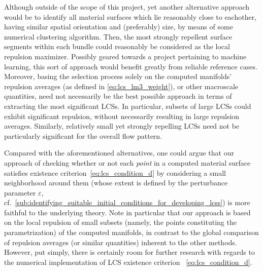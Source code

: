 Although outside of the scope of this project, yet another alternative
approach would be to identify all material surfaces which lie reasonably close
to eachother, having similar spatial orientation and (preferably) size, by
means of some numerical clustering algorithm. Then, the most strongly repellent
surface segments within each bundle could reasonably be considered as the local
repulsion maximizer. Possibly geared towards a project pertaining to machine
learning, this sort of approach would benefit greatly from reliable reference
cases. Moreover, basing the selection process solely on the computed manifolds'
repulsion averages (as defined in \cref{eq:lcs_lm3_weight}), or other
macroscale quantities, need not necessarily be the best possible approach in
terms of extracting the most significant LCSs. In particular, subsets of large
LCSs could exhibit significant repulsion, without necessarily resulting in
large repulsion averages. Similarly, relatively small yet strongly repelling
LCSs need not be particularly significant for the overall flow pattern.

Compared with the aforementioned alternatives, one could argue that our
approach of checking whether or not each \emph{point} in a computed material
surface satisfies existence criterion~\eqref{eq:lcs_condition_d} by considering
a small neighborhood around them (whose extent is defined by the perturbance
parameter $\varepsilon$, cf.\
\cref{sub:identifying_suitable_initial_conditions_for_developing_lcss}) is more
faithful to the underlying theory. Note in particular that our approach is
based on the local repulsion of small subsets (namely, the points constituting
the parametrization) of the computed manifolds, in contrast to the global
comparison of repulsion averages (or similar quantities) inherent to the other
methods. However, put simply, there is certainly room for further research with
regards to the numerical implementation of LCS existence criterion~%
\eqref{eq:lcs_condition_d}.
